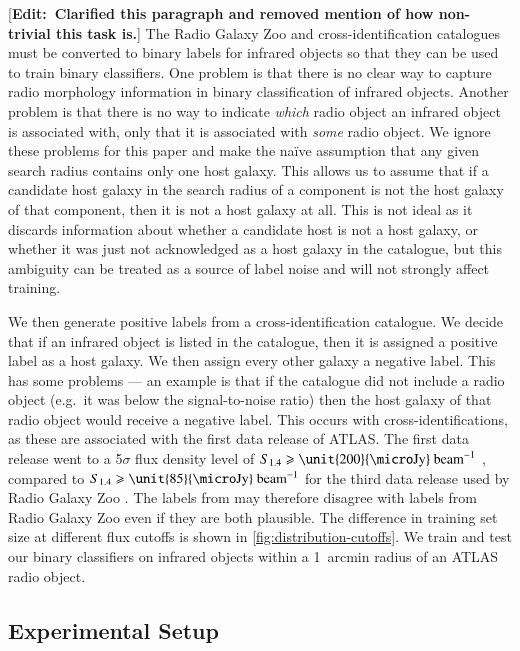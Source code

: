 \documentclass[fleqn,usenatbib,usedcolumn]{mnras}
\newcommand{\jansky}{\text{Jy}}
\newcommand{\edit}[1]{ {\color{red}[{\bf Edit:~{#1}}]} }
\begin{document}
    \edit{Clarified this paragraph and removed mention of how non-trivial this task is.} The Radio Galaxy Zoo and \citet{norris06} cross-identification catalogues must be converted to binary labels for infrared objects so that they can be used to train binary classifiers. One problem is that there is no clear way to capture radio morphology information in binary classification of infrared objects. Another problem is that there is no way to indicate \emph{which} radio object an infrared object is associated with, only that it is associated with \emph{some} radio object. We ignore these problems for this paper and make the na\"ive assumption that any given search radius contains only one host galaxy. This allows us to assume that if a candidate host galaxy in the search radius of a component is not the host galaxy of that component, then it is not a host galaxy at all. This is not ideal as it discards information about whether a candidate host is not a host galaxy, or whether it was just not acknowledged as a host galaxy in the catalogue, but this ambiguity can be treated as a source of label noise and will not strongly affect training.

    We then generate positive labels from a cross-identification catalogue.
    We decide that if an infrared object is listed in the catalogue, then it
    is assigned a positive label as a host galaxy. We then assign every other galaxy a negative label. This has some problems
    --- an example is that if the catalogue did not include a radio
    object (e.g.~it was below the signal-to-noise ratio) then the host galaxy
    of that radio object would receive a negative label. This occurs with
    \citet{norris06} cross-identifications, as these are associated with the
    first data release of ATLAS. The first data release went to a 5$\sigma$
    flux density level of $S_{1.4} \geq \unit{200}{\micro\jansky}\text{
    beam}^{-1}$ \citep{norris06}, compared to $S_{1.4} \geq \unit{85}{\micro\jansky}\text{
    beam}^{-1}$ for the third data release used by Radio Galaxy Zoo
    \citep{franzen15}. The labels from \citet{norris06} may therefore disagree with labels
    from Radio Galaxy Zoo even if they are both plausible. The difference in
    training set size at different flux cutoffs is shown in
    \autoref{fig:distribution-cutoffs}. We train and test our binary classifiers on infrared objects within a 1~arcmin radius of an ATLAS radio object.

  \subsection{Experimental Setup}
  \label{sec:experimental-setup}
\end{document}
